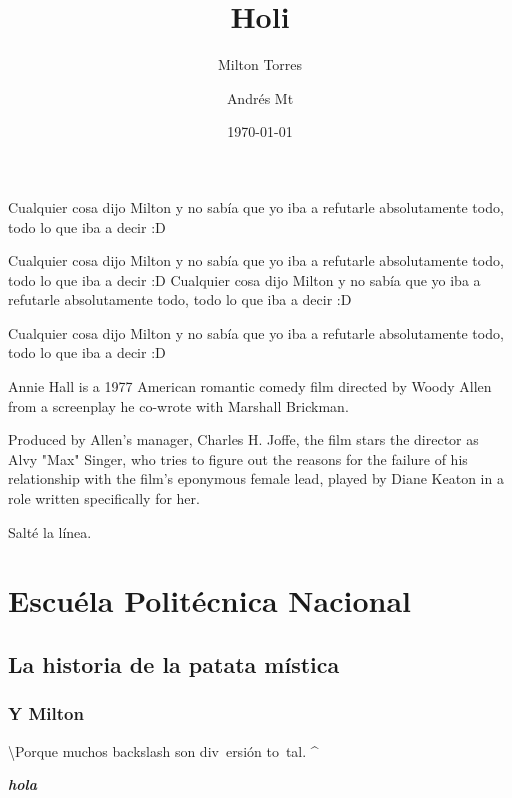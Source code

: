 \documentclass[a5paper, 12pt]{article}
\author{Milton Torres \and Andrés Mt}
\title{Holi}
\date{\today}
\begin{document}
	\maketitle
	
	Cualquier cosa dijo                                                                                                                                                                Milton y no sabía que yo iba a refutarle absolutamente todo, todo lo que iba a decir :D
	
{	\color{yellow}Cualquier cosa dijo Milton y no sabía que yo iba a refutarle absolutamente todo, todo lo que iba a decir :D}
Cualquier cosa dijo Milton y no sabía que yo iba a refutarle absolutamente todo, todo lo que iba a decir :D

Cualquier cosa dijo Milton y no sabía que yo iba a refutarle absolutamente todo, todo lo que iba a decir :D


\setlength{\columnsep}{30pt}
\begin{multicols}{2}
		Annie Hall is a 1977 American romantic comedy film directed by Woody Allen from a screenplay he co-wrote with Marshall Brickman.
		
		 Produced by Allen’s manager, Charles H. Joffe, the film stars the director as Alvy "Max" Singer, who tries to figure out the reasons for the failure of his relationship with the film’s eponymous female lead, played by Diane Keaton in a role written specifically for her.
\end{multicols}
	
	Salté la línea.
	
	\section[EPN]{Escuéla Politécnica Nacional}
	
	\subsection{La historia de la patata mística}
	\subsubsection{Y Milton}
	
	\textbackslash Po\hspace{2\baselineskip}rque m\qquad uchos back\quad slash son div\, ersión to\ tal. \^{}
	
	
	\textbf{\emph{hola}}	
\end{document}
